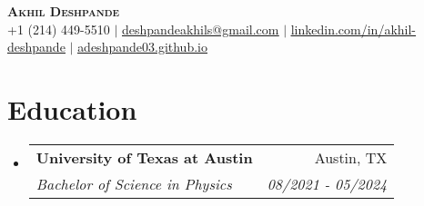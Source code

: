 \documentclass[letterpaper]{article}
\makeatletter
\newcommand{\resumeSubheading}[4]{
  \vspace{-2pt}\item
    \begin{tabular*}{0.97\textwidth}[t]{l@{\extracolsep{\fill}}r}
      \textbf{#1} & #2 \\
      \textit{\small#3} & \textit{\small #4} \\
    \end{tabular*}\vspace{-7pt}
}
\newcommand{\resumeSubHeadingListStart}{\begin{itemize}[leftmargin=0.15in, label={}]}
\newcommand{\resumeSubHeadingListEnd}{\end{itemize}}
\makeatother
\begin{document}

\begin{center}
    \textbf{\Huge \scshape Akhil Deshpande} \\ \vspace{1pt}
    \small +1 (214) 449-5510 $|$ \href{deshpandeakhils@gmail.com}{\underline{deshpandeakhils@gmail.com}} $|$ 
    \href{https://www.linkedin.com/in/akhil-deshpande/}{\underline{linkedin.com/in/akhil-deshpande}} $|$
    \href{https://adeshpande03.github.io}{\underline{adeshpande03.github.io}}
\end{center}


\section{Education}
  \resumeSubHeadingListStart
    \resumeSubheading
      {University of Texas at Austin}{Austin, TX}
      {Bachelor of Science in Physics}{08/2021 - 05/2024}
    
  \resumeSubHeadingListEnd
\end{document}
